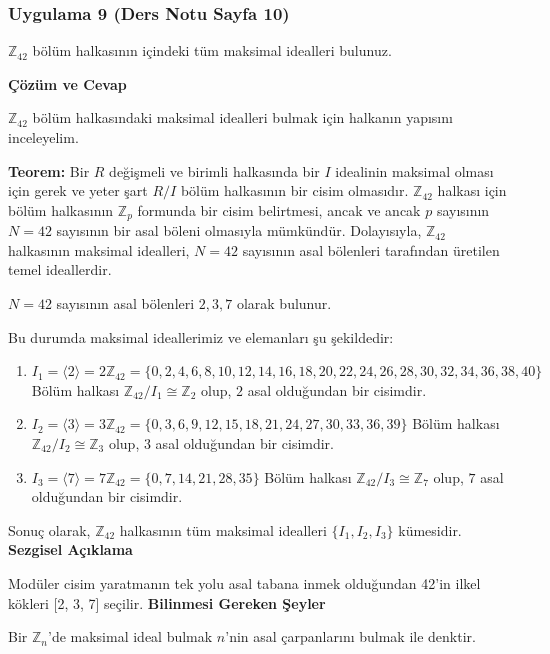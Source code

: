 \documentclass[11pt, a4paper]{article}
\newenvironment{cozum}{
    \vspace{0.5cm}
    \noindent\textcolor{green!60!black}{\faCheckCircle\enspace \textbf{\Large Çözüm ve Cevap}}\par\vspace{0.2cm}
}{}
\newenvironment{sezgisel}{
    \vspace{0.5cm}
    \noindent\textcolor{orange!80!black}{\faLightbulb\enspace \textbf{\Large Sezgisel Açıklama}}\par\vspace{0.2cm}
    \itshape
}{}
\newenvironment{bilgi}{
    \vspace{0.5cm}
    \noindent\textcolor{red!70!black}{\faExclamationTriangle\enspace \textbf{\Large Bilinmesi Gereken Şeyler}}\par\vspace{0.2cm}
}{}
\begin{document}
\subsubsection{Uygulama 9 (Ders Notu Sayfa 10)}
\begin{sorubox}
$\mathbb{Z}_{42}$ bölüm halkasının içindeki tüm maksimal idealleri bulunuz.
\end{sorubox}
\begin{cozum}
$\mathbb{Z}_{42}$ bölüm halkasındaki maksimal idealleri bulmak için halkanın yapısını inceleyelim.

\textbf{Teorem:} Bir $R$ değişmeli ve birimli halkasında bir $I$ idealinin maksimal olması için gerek ve yeter şart $R/I$ bölüm halkasının bir cisim olmasıdır. $\mathbb{Z}_{42}$ halkası için bölüm halkasının $\mathbb{Z}_p$ formunda bir cisim belirtmesi, ancak ve ancak $p$ sayısının $N = 42$ sayısının bir asal böleni olmasıyla mümkündür. Dolayısıyla, $\mathbb{Z}_{42}$ halkasının maksimal idealleri, $N = 42$ sayısının asal bölenleri tarafından üretilen temel ideallerdir.

$N = 42$ sayısının asal bölenleri $2, 3, 7$ olarak bulunur.

Bu durumda maksimal ideallerimiz ve elemanları şu şekildedir:
\begin{enumerate}
    \item $I_{1} = \langle 2 \rangle = 2\mathbb{Z}_{42} = \{0, 2, 4, 6, 8, 10, 12, 14, 16, 18, 20, 22, 24, 26, 28, 30, 32, 34, 36, 38, 40\}$
    Bölüm halkası $\mathbb{Z}_{42} / I_{1} \cong \mathbb{Z}_{2}$ olup, $2$ asal olduğundan bir cisimdir.
    \item $I_{2} = \langle 3 \rangle = 3\mathbb{Z}_{42} = \{0, 3, 6, 9, 12, 15, 18, 21, 24, 27, 30, 33, 36, 39\}$
    Bölüm halkası $\mathbb{Z}_{42} / I_{2} \cong \mathbb{Z}_{3}$ olup, $3$ asal olduğundan bir cisimdir.
    \item $I_{3} = \langle 7 \rangle = 7\mathbb{Z}_{42} = \{0, 7, 14, 21, 28, 35\}$
    Bölüm halkası $\mathbb{Z}_{42} / I_{3} \cong \mathbb{Z}_{7}$ olup, $7$ asal olduğundan bir cisimdir.
\end{enumerate}

Sonuç olarak, $\mathbb{Z}_{42}$ halkasının tüm maksimal idealleri $\{I_1, I_2, I_3\}$ kümesidir.
\end{cozum}
\begin{sezgisel}
Modüler cisim yaratmanın tek yolu asal tabana inmek olduğundan 42'in ilkel kökleri [2, 3, 7] seçilir.
\end{sezgisel}
\begin{bilgi}
Bir $\mathbb{Z}_n$'de maksimal ideal bulmak $n$'nin asal çarpanlarını bulmak ile denktir.
\end{bilgi}
\end{document}
